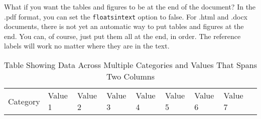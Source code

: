 \documentclass[
  jou,
  floatsintext,
  longtable,
  nolmodern,
  notxfonts,
  notimes,
  colorlinks=true,linkcolor=blue,citecolor=blue,urlcolor=blue]{apa7}
\newenvironment{twocolumntable}%
{%
\begin{table*}[!htbp]%
\onecolumn%
}%
{%
\twocolumn%
\end{table*}%
}%
\begin{document}
What if you want the tables and figures to be at the end of the
document? In the .pdf format, you can set the \texttt{floatsintext}
option to false. For .html and .docx documents, there is not yet an
automatic way to put tables and figures at the end. You can, of course,
just put them all at the end, in order. The reference labels will work
no matter where they are in the text.

\begin{twocolumntable}

\begin{longtable}[]{@{}
  >{\raggedright\arraybackslash}p{}
  >{\centering\arraybackslash}p{}
  >{\centering\arraybackslash}p{}
  >{\centering\arraybackslash}p{}
  >{\centering\arraybackslash}p{}
  >{\centering\arraybackslash}p{}
  >{\centering\arraybackslash}p{}
  >{\centering\arraybackslash}p{}
  >{\centering\arraybackslash}p{}@{}}
\caption{Table Showing Data Across Multiple Categories and Values That
Spans Two Columns}\label{tbl-widedata}\tabularnewline
\toprule\noalign{}
\begin{minipage}[b]{\linewidth}\raggedright
Category
\end{minipage} & \begin{minipage}[b]{\linewidth}\centering
Value 1
\end{minipage} & \begin{minipage}[b]{\linewidth}\centering
Value 2
\end{minipage} & \begin{minipage}[b]{\linewidth}\centering
Value 3
\end{minipage} & \begin{minipage}[b]{\linewidth}\centering
Value 4
\end{minipage} & \begin{minipage}[b]{\linewidth}\centering
Value 5
\end{minipage} & \begin{minipage}[b]{\linewidth}\centering
Value 6
\end{minipage} & \begin{minipage}[b]{\linewidth}\centering
Value 7
\end{minipage} & \begin{minipage}[b]{\linewidth}\centering

\end{minipage}
\end{longtable}
\end{twocolumntable}
\end{document}
